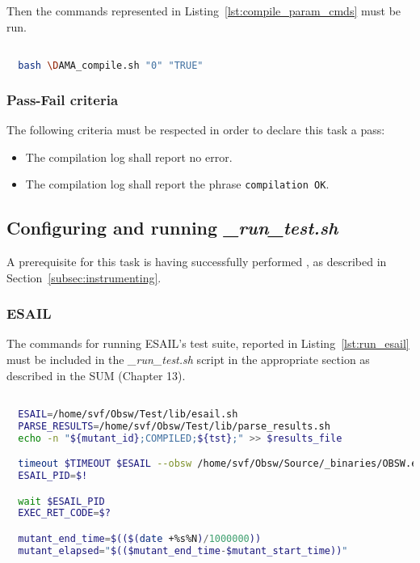Then the commands represented in Listing~\ref{lst:compile_param_cmds} must be run.

  \begin{lstlisting}[language=bash, label={lst:compile_param_cmds}]

  bash \DAMA_compile.sh "0" "TRUE"

  \end{lstlisting}

\subsubsection{Pass-Fail criteria}

The following criteria must be respected in order to declare this task a pass:
\begin{itemize}
  \item The compilation log shall report no error.
  \item The compilation log shall report the phrase \texttt{compilation OK}.
\end{itemize}


\subsection{Configuring and running \emph{\DAMA\_run\_test.sh}}

A prerequisite for this task is having successfully performed , as described in Section~\ref{subsec:instrumenting}.

\subsubsection{ESAIL}

The commands for running ESAIL's test suite, reported in Listing~\ref{lst:run_esail} must be included in the \emph{\DAMA\_run\_test.sh} script in the appropriate section as described in the SUM (Chapter 13).


  \begin{lstlisting}[language=bash, label={lst:run_esail}]

  ESAIL=/home/svf/Obsw/Test/lib/esail.sh
  PARSE_RESULTS=/home/svf/Obsw/Test/lib/parse_results.sh
  echo -n "${mutant_id};COMPILED;${tst};" >> $results_file

  timeout $TIMEOUT $ESAIL --obsw /home/svf/Obsw/Source/_binaries/OBSW.exe --fast -n -c --source /home/svf/Obsw/Source --version 04010000 -t $tst &
  ESAIL_PID=$!

  wait $ESAIL_PID
  EXEC_RET_CODE=$?

  mutant_end_time=$(($(date +%s%N)/1000000))
  mutant_elapsed="$(($mutant_end_time-$mutant_start_time))"

  \end{lstlisting}

